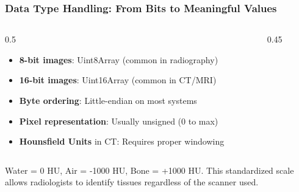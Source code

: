 \begin{frame}
\frametitle{Data Type Handling: From Bits to Meaningful Values}

\begin{columns}[T]
\begin{column}{0.5\textwidth}
  \begin{itemize}
    \item \textbf{8-bit images}: Uint8Array (common in radiography)
    \item \textbf{16-bit images}: Uint16Array (common in CT/MRI)
    \item \textbf{Byte ordering}: Little-endian on most systems
    \item \textbf{Pixel representation}: Usually unsigned (0 to max)
    \item \textbf{Hounsfield Units} in CT: Requires proper windowing
  \end{itemize}
\end{column}
\begin{column}{0.45\textwidth}
  \begin{center}
  \end{center}
\end{column}
\end{columns}

Water = 0 HU, Air = -1000 HU, Bone = +1000 HU. This standardized scale allows radiologists to identify tissues regardless of the scanner used.
\end{frame}

